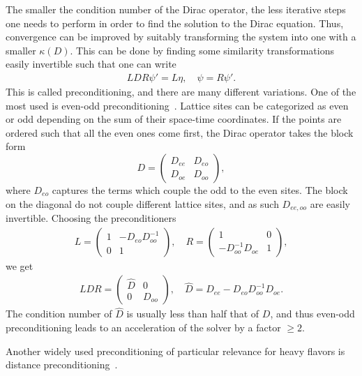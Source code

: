 The smaller the condition number of the Dirac operator, the less iterative steps one needs to perform in order to find the solution to the Dirac equation. Thus, convergence can be improved by suitably transforming the system into one with a smaller $\kappa(D)$. This can be done by finding some similarity transformations easily invertible such that one can write
\begin{gather}
LDR\psi'=L\eta, \quad \psi=R\psi'.
\end{gather}
This is called preconditioning, and there are many different variations. One of the most used is even-odd preconditioning~\citep{DEGRAND1988161}. Lattice sites can be categorized as even or odd depending on the sum of their space-time coordinates. If the points are ordered such that all the even ones come first, the Dirac operator takes the block form
\begin{equation}
D=\begin{pmatrix}
D_{ee} & D_{eo} \\ 
D_{oe} & D_{oo}
\end{pmatrix},
\end{equation}
where $D_{eo}$ captures the terms which couple the odd to the even sites. The block on the diagonal do not couple different lattice sites, and as such $D_{ee,oo}$ are easily invertible. Choosing the preconditioners
\begin{gather}
L=\begin{pmatrix}
1 & -D_{eo}D_{oo}^{-1} \\ 
0 & 1
\end{pmatrix}, \quad 
R=\begin{pmatrix}
1 & 0 \\ 
-D_{oo}^{-1}D_{oe} &  1
\end{pmatrix},
\end{gather}
we get
\begin{gather}
LDR=\begin{pmatrix}
\hat{D} & 0 \\ 
0 & D_{oo}
\end{pmatrix}, \quad
\hat{D}=D_{ee}-D_{eo}D_{oo}^{-1}D_{oe}.
\end{gather}
The condition number of $\hat{D}$ is usually less than half that of $D$, and thus even-odd preconditioning leads to an acceleration of the solver by a factor $\geq2$.

Another widely used preconditioning of particular relevance for heavy flavors is distance preconditioning~\citep{deDivitiis:2010ya}. 




